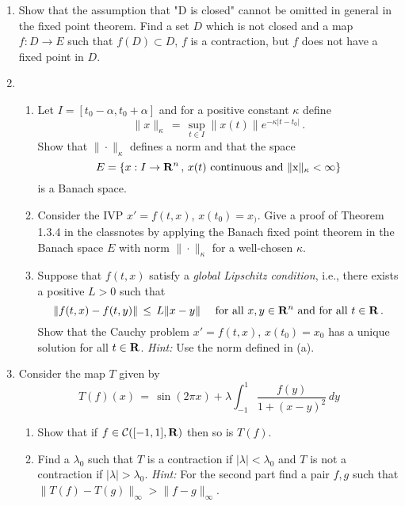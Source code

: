 \documentclass[12pt]{report}
\newcommand{\bR}{{\bf R}}
\def\to{\rightarrow}
\begin{document}
\begin{enumerate}
\item Show that the assumption that "D is closed" cannot be omitted in
general in the fixed point theorem. Find a set $D$ which is not closed
and a map $f: D \to E$ such that $f(D) \subset D$, $f$ is a
contraction, but $f$ does not have a fixed point in $D$.

\item 
\begin{enumerate}
\item Let $I=[t_0 -\alpha, t_0 + \alpha]$ and for a positive constant $\kappa$ define 
$$
\| x \|_\kappa \,=\, \sup_{t \in I } \| x(t)\| e^{- \kappa |t-t_0|}\,.
$$
Show that $ \| \cdot \|_\kappa$ defines a norm and that the space 
$$
E = \{ x : I  \to \bR^n\,,\, x(t) {\rm~continuous~ and~ \|x \|_\kappa < \infty}\} 
$$ 
is a Banach space.  
\item  Consider the IVP $x'=f(t,x)$, $x(t_0)=x_)$. Give a proof of Theorem 1.3.4 in the classnotes by applying the Banach fixed point theorem in the Banach space $E$ with norm $\| \cdot \|_{\kappa}$ for a well-chosen $\kappa$.
\item Suppose that $f(t,x)$ satisfy a {\em global Lipschitz condition}, i.e., there exists a positive $L >0$ such that
\begin{equation}
\| f(t, x) - f(t, y) \| \,\le \, L \|x - y\| \quad {\rm ~for~all~} x, y \in
\bR^n {\rm ~and ~for~all~} t \in \bR \,.
\end{equation}
Show that the Cauchy problem $x'=f(t,x)$, $x(t_0)=x_0$ has a unique solution for all $t \in \bR$.  
{\em Hint:} Use the norm defined in (a). 
\end{enumerate}
 
\item Consider the map $T$  given by 
$$
T(f) (x) \,=\, \sin(2 \pi x) + \lambda \int_{-1}^{1} \frac{f(y)}{1 + (x -y)^2} \, dy
$$
\begin{enumerate}
\item Show that if $f \in { \cal C}( [-1,1], \bR)$ then so is $T(f)$. 
\item Find a $\lambda_0$ such that $T$ is a contraction if $|\lambda| < \lambda_0$
and $T$ is not a contraction if $|\lambda| > \lambda_0$.  {\em Hint:} For the second part find a pair 
$f,g$ such that $\|T(f) - T(g)\|_\infty > \|f-g\|_\infty$. 
\end{enumerate}



\end{enumerate}
\end{document}
